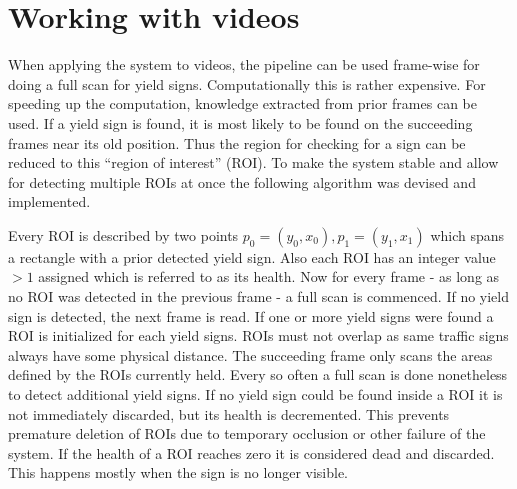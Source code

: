 \documentclass{report}
\begin{document}
\section{Working with videos}

When applying the system to videos, the pipeline can be used
frame-wise for doing a full scan for yield signs. Computationally this
is rather expensive. For speeding up the computation, knowledge
extracted from prior frames can be used. If a yield sign is found, it
is most likely to be found on the succeeding frames near its old
position. Thus the region for checking for a sign can be reduced to
this ``region of interest'' (ROI). To make the system stable and allow
for detecting multiple ROIs at once the following algorithm was
devised and implemented.

Every ROI is described by two points \( p_0 = (y_0, x_0), p_1 = (y_1,
x_1) \) which spans a rectangle with a prior detected yield sign. Also
each ROI has an integer value \( > 1 \) assigned which is referred to
as its health. Now for every frame - as long as no ROI was detected in
the previous frame - a full scan is commenced. If no yield sign is
detected, the next frame is read. If one or more yield signs were
found a ROI is initialized for each yield signs. ROIs must not overlap
as same traffic signs always have some physical distance. The
succeeding frame only scans the areas defined by the ROIs currently
held. Every so often a full scan is done nonetheless to detect
additional yield signs. If no yield sign could be found inside a ROI
it is not immediately discarded, but its health is decremented. This
prevents premature deletion of ROIs due to temporary occlusion or
other failure of the system. If the health of a ROI reaches zero it is
considered dead and discarded. This happens mostly when the sign is no
longer visible.
\end{document}

